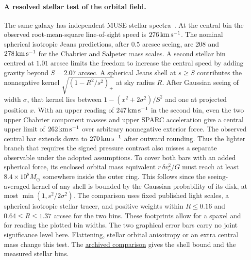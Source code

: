 \documentclass[11pt]{article}
\begin{document}
\paragraph{A resolved stellar test of the orbital field.}
The same galaxy has independent MUSE stellar spectra~\cite{jackpot2024}.
At the central bin the observed root-mean-square line-of-sight speed is
$276\,{\rm km\,s^{-1}}$. The nominal spherical isotropic Jeans predictions,
after $0.5$ arcsec seeing, are $208$ and $278\,{\rm km\,s^{-1}}$ for
the Chabrier and Salpeter mass scales. A second stellar bin centred at
$1.01$ arcsec limits the freedom to increase the central speed by adding
gravity beyond $S=2.07$ arcsec. A spherical Jeans shell at $s\ge S$
contributes the nonnegative kernel
$\sqrt{(1-R^2/s^2)_+}$ at sky radius $R$. After Gaussian seeing of
width $\sigma$, that kernel lies between
$1-(x^2+2\sigma^2)/S^2$ and one at projected position $x$.
With an upper reading of $247\,{\rm km\,s^{-1}}$ in the second bin,
even the two upper Chabrier component masses and upper SPARC acceleration
give a central upper limit of $262\,{\rm km\,s^{-1}}$ over arbitrary
nonnegative exterior force. The observed central bar extends down to
$270\,{\rm km\,s^{-1}}$ after outward rounding. Thus the lighter branch
that requires the signed pressure contrast also misses a separate observable
under the adopted assumptions. To cover both bars with an added spherical
force, its enclosed orbital mass equivalent $r\,\delta v_c^2/G$ must
reach at least $8.4\times10^8 M_\odot$ somewhere inside the outer ring.
This follows since the seeing-averaged kernel of any shell is bounded by
the Gaussian probability of its disk, at most $\min(1,s^2/2\sigma^2)$.
The comparison uses fixed published light
scales, a spherical isotropic stellar tracer, and positive weights within
$R\le0.16$ and $0.64\le R\le1.37$ arcsec for the two bins.
These footprints allow for a spaxel and for reading the plotted bin widths.
The two graphical error bars carry no joint significance level here.
Flattening, stellar orbital anisotropy or an extra central mass change
this test. The
\href{https://github.com/FloatingPragma/observer-patch-holography/tree/main/code/cosmology/rar_deep_regime/double_ring_pressure/resolved_kinematics}{archived comparison}
gives the shell bound and the measured stellar bins.
\end{document}
